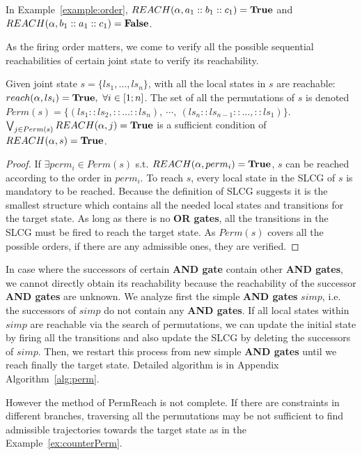 In Example~\ref{example:order}, $REACH(\alpha,a_1::b_1::c_1)=\mathbf{True}$ and $REACH(\alpha,b_1::a_1::c_1)=\mathbf{False}$.


As the firing order matters, we come to verify all the possible sequential reachabilities of certain joint state to verify its reachability.

\begin{proposition}\label{theoperm}
Given joint state $s=\{ls_1,\ldots,ls_n\}$, with all the local states in $s$ are reachable: $reach(\alpha,ls_i)=\true,\ \forall i\in[1;n]$.
The set of all the permutations of $s$ is denoted $Perm(s)=\{(ls_1::ls_2,::\ldots ::ls_n),\ \cdots,\ (ls_n::ls_{n-1}::\ldots,::ls_1)\}$.
$\bigvee_{j\in Perm(s)} REACH(\alpha,j)=\mathbf{True}$ is a sufficient condition of $REACH(\alpha,s)=\mathbf{True}$.
\end{proposition}

\begin{proof}
If $\exists perm_i\in Perm(s)$ s.t. $REACH(\alpha,perm_i)=\mathbf{True}$, $s$ can be reached according to the order in $perm_i$.
To reach $s$, every local state in the SLCG of $s$ is mandatory to be reached. 
Because the definition of SLCG suggests it is the smallest structure which contains all the needed local states and transitions for the target state.
As long as there is no \textbf{OR gates}, all the transitions in the SLCG must be fired to reach the target state.
As $Perm(s)$ covers all the possible orders, if there are any admissible ones, they are verified.
\end{proof}

In case where the successors of certain \textbf{AND gate} contain other \textbf{AND gates}, we cannot directly obtain its reachability because the reachability of the successor \textbf{AND gates} are unknown.
We analyze first the simple \textbf{AND gates} $simp$, i.e. the successors of $simp$ do not contain any \textbf{AND gates}.
If all local states within $simp$ are reachable via the search of permutations, we can update the initial state by firing all the transitions and also update the SLCG by deleting the successors of $simp$. 
Then, we restart this process from new simple \textbf{AND gates} until we reach finally the target state.
Detailed algorithm is in Appendix Algorithm~\ref{alg:perm}.

However the method of PermReach is not complete. 
If there are constraints in different branches, traversing all the permutations may be not sufficient to find admissible trajectories towards the target state as in the Example~\ref{ex:counterPerm}.

